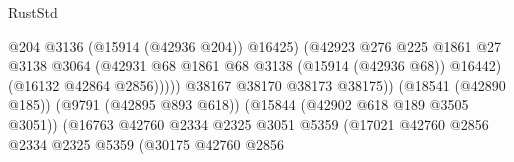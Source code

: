 \begin{lexlean}{RustStd}
\begin{coremodule}
                                                            @204
                                                            @3136
                                                            (@15914 (@42936 @204))
                                                            @16425)
                                                          (@42923
                                                            @276
                                                            @225
                                                            @1861
                                                            @27
                                                            @3138
                                                            @3064
                                                            (@42931
                                                              @68
                                                              @1861
                                                              @68
                                                              @3138
                                                              (@15914 (@42936 @68))
                                                              @16442)
                                                            (@16132 @42864 @2856)))))
                                                    @38167
                                                    @38170
                                                    @38173
                                                    @38175))
                                                (@18541 (@42890 @185))
                                                (@9791 (@42895 @893 @618))
                                                (@15844 (@42902 @618 @189 @3505 @3051))
                                                (@16763
                                                  @42760
                                                  @2334
                                                  @2325
                                                  @3051
                                                  @5359
                                                  (@17021
                                                    @42760
                                                    @2856
                                                    @2334
                                                    @2325
                                                    @5359
                                                    (@30175
                                                      @42760
                                                      @2856

\end{coremodule}
\end{lexlean}
